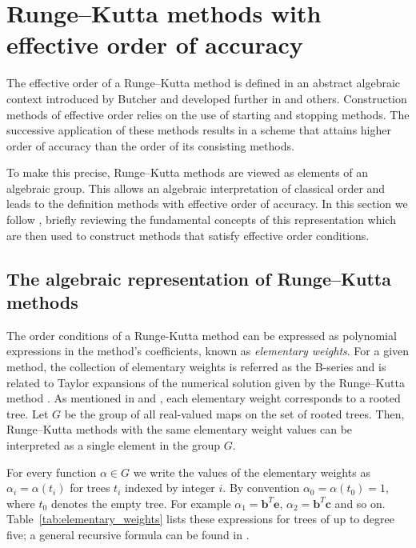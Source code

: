 \section{Runge--Kutta methods with effective order of accuracy}\label{sec:Algebraic_RK}
The effective order of a Runge--Kutta method is defined in an abstract 
algebraic context introduced by Butcher \cite{Butcher1969} and developed 
further in \cite{Butcher1972, Hairer1974, Butcher1996, Butcher1998} and 
others.
Construction methods of effective order relies on the use of starting and 
stopping methods.
The successive application of these methods results in a scheme that attains 
higher order of accuracy than the order of its consisting methods.

To make this precise, Runge--Kutta methods are viewed as elements
of an algebraic group. This allows an algebraic interpretation of classical 
order and leads to the definition methods with effective order of accuracy. 
In this section we follow \cite{Butcher2008_book}, briefly reviewing the 
fundamental concepts of this representation which are then used to 
construct methods that satisfy effective order conditions.

\subsection{The algebraic representation of Runge--Kutta methods}\label{subsec:Algebraic_representation}
The order conditions of a Runge-Kutta method can be expressed as  
polynomial expressions in the method's coefficients, known as  
\emph{elementary weights}.
For a given method, the collection of elementary weights is referred as 
the B-series and is related to Taylor expansions of the numerical solution 
given by the Runge--Kutta method \cite{Hairer1974, Butcher2008_book}.  
As mentioned in \cite{Butcher1972} and \cite{Butcher2008_book}, each 
elementary weight corresponds to a rooted tree. 
Let $G$ be the group of all real-valued maps on the set
of rooted trees.
Then, Runge--Kutta methods with the same elementary weight values 
can be interpreted as a single element in the group $G$.

For every function $\alpha \in G$ we write the values of the
elementary weights as $\alpha_{i} = \alpha(t_{i})$ for trees $t_{i}$
indexed by integer $i$.
By convention $\alpha_0 = \alpha(t_{0}) = 1$, where $t_{0}$ denotes the empty tree. 
For example $\alpha_1 = \bm{b}^T\bm{e}$, $\alpha_2 = \bm{b}^T\bm{c}$ and so on.
Table~\ref{tab:elementary_weights} lists these expressions for trees of 
up to degree five; a general recursive formula can be found in 
\cite[Definition 312A]{Butcher2008_book}. 

